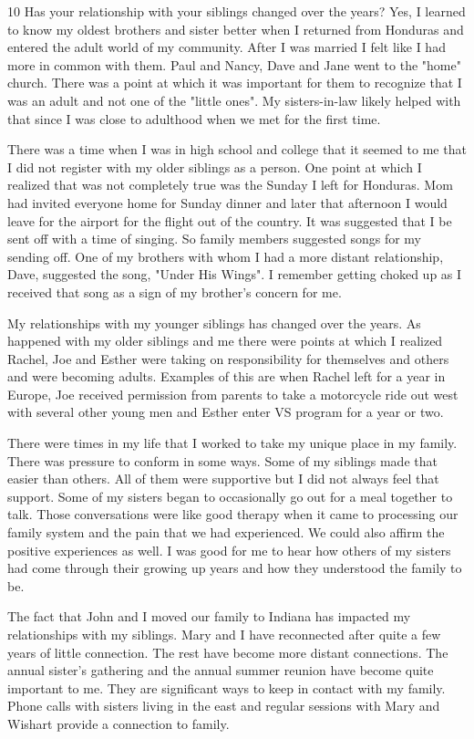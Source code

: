 10 Has your relationship with your siblings changed over the years?
Yes, I learned to know my oldest brothers and sister better when I returned from Honduras and entered the adult world of my community.
After I was married I felt like I had more in common with them.
Paul and Nancy, Dave and Jane went to the "home" church.
There was a point at which it was important for them to recognize that I was an adult and not one of the "little ones".
My sisters-in-law likely helped with that since I was close to adulthood when we met for the first time.

There was a time when I was in high school and college that it seemed to me that I did not register with my older siblings as a person.
One point at which I realized that was not completely true was the Sunday I left for Honduras.
Mom had invited everyone home for Sunday dinner and later that afternoon I would leave for the airport for the flight out of the country.
It was suggested that I be sent off with a time of singing.
So family members suggested songs for my sending off.
One of my brothers with whom I had a more distant relationship, Dave, suggested the song, "Under His Wings".
I remember getting choked up as I received that song as a sign of my brother's concern for me.

My relationships with my younger siblings has changed over the years.
As happened with my older siblings and me there were points at which I realized Rachel, Joe and Esther were taking on responsibility for themselves and others and were becoming adults.
Examples of this are when Rachel left for a year in Europe, Joe received permission from parents to take a motorcycle ride out west with several other young men and Esther enter VS program for a year or two.

There were times in my life that I worked to take my unique place in my family.
There was pressure to conform in some ways.
Some of my siblings made that easier than others.
All of them were supportive but I did not always feel that support.
Some of my sisters began to occasionally go out for a meal together to talk.
Those conversations were like good therapy when it came to processing our family system and the pain that we had experienced.
We could also affirm the positive experiences as well.
I was good for me to hear how others of my sisters had come through their growing up years and how they understood the family to be.

The fact that John and I moved our family to Indiana has impacted my relationships with my siblings.
Mary and I have reconnected after quite a few years of little connection.
The rest have become more distant connections.
The annual sister's gathering and the annual summer reunion have become quite important to me.
They are significant ways to keep in contact with my family.
Phone calls with sisters living in the east and regular sessions with Mary and Wishart provide a connection to family.






